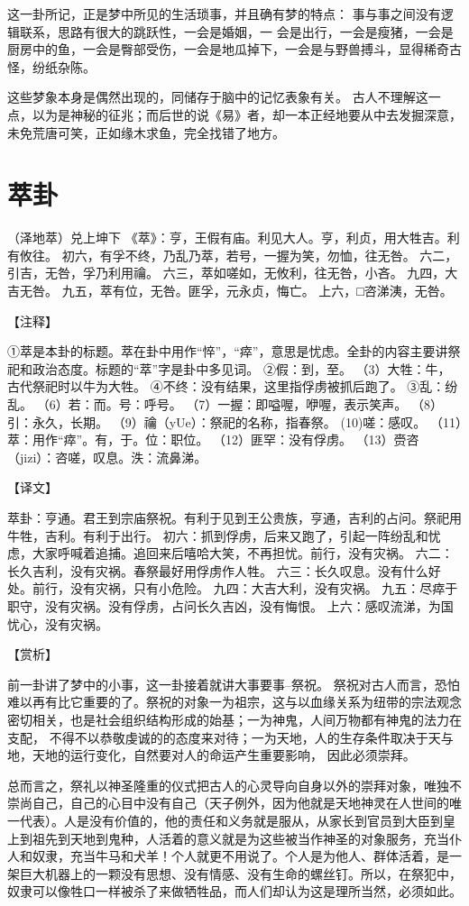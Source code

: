\documentclass[a4paper,12pt,UTF8,twoside]{ctexbook}
\begin{document}
这一卦所记，正是梦中所见的生活琐事，并且确有梦的特点： 事与事之间没有逻辑联系，思路有很大的跳跃性，一会是婚姻，一 会是出行，一会是瘦猪，一会是厨房中的鱼，一会是臀部受伤，一会是地瓜掉下，一会是与野兽搏斗，显得稀奇古怪，纷纸杂陈。

这些梦象本身是偶然出现的，同储存于脑中的记忆表象有关。 古人不理解这一点，以为是神秘的征兆；而后世的说《易》者，却一本正经地要从中去发掘深意，未免荒唐可笑，正如缘木求鱼，完全找错了地方。

\chapter{萃卦}

（泽地萃）兑上坤下
《萃》：亨，王假有庙。利见大人。亨，利贞，用大牲吉。利有攸往。
初六，有孚不终，乃乱乃萃，若号，一握为笑，勿恤，往无咎。
六二，引吉，无咎，孚乃利用禴。
六三，萃如嗟如，无攸利，往无咎，小吝。
九四，大吉无咎。
九五，萃有位，无咎。匪孚，元永贞，悔亡。
上六，□咨涕洟，无咎。

【注释】

①萃是本卦的标题。萃在卦中用作“悴”，“瘁”，意思是忧虑。全卦的内容主要讲祭祀和政治态度。标题的“萃”字是卦中多见词。
②假：到，至。
（3）大牲：牛，古代祭祀时以牛为大牲。
④不终：没有结果，这里指俘虏被抓后跑了。
③乱：纷乱。
（6）若：而。号：呼号。
（7）一握：即嗌喔，咿喔，表示笑声。
（8）引：永久，长期。
（9）禴（yUe）：祭祀的名称，指春祭。
(10)嗟：感叹。
（11）萃：用作“瘁”。有，于。位：职位。
（12）匪罕：没有俘虏。
（13）赍咨（jizi）：咨嗟，叹息。泆：流鼻涕。

【译文】

萃卦：亨通。君王到宗庙祭祝。有利于见到王公贵族，亨通，吉利的占问。祭祀用牛牲，吉利。有利于出行。
初六：抓到俘虏，后来又跑了，引起一阵纷乱和忧虑，大家呼喊着追捕。追回来后嘻哈大笑，不再担忧。前行，没有灾祸。
六二：长久吉利，没有灾祸。春祭最好用俘虏作人牲。
六三：长久叹息。没有什么好处。前行，没有灾祸，只有小危险。
九四：大吉大利，没有灾祸。
九五：尽瘁于职守，没有灾祸。没有俘虏，占问长久吉凶，没有悔恨。
上六：感叹流涕，为国忧心，没有灾祸。

【赏析】

前一卦讲了梦中的小事，这一卦接着就讲大事要事--祭祝。 祭祝对古人而言，恐怕难以再有比它重要的了。祭祝的对象一为祖宗，这与以血缘关系为纽带的宗法观念密切相关，也是社会组织结构形成的始基；一为神鬼，人间万物都有神鬼的法力在支配， 不得不以恭敬虔诚的的态度来对待；一为天地，人的生存条件取决于天与地，天地的运行变化，自然要对人的命运产生重要影响， 因此必须崇拜。

总而言之，祭礼以神圣隆重的仪式把古人的心灵导向自身以外的崇拜对象，唯独不崇尚自己，自己的心目中没有自己（天子例外，因为他就是天地神灵在人世间的唯一代表）。人是没有价值的，他的责任和义务就是服从，从家长到官员到大臣到皇上到祖先到天地到鬼种，人活着的意义就是为这些被当作神圣的对象服务，充当仆人和奴隶，充当牛马和犬羊！个人就更不用说了。个人是为他人、群体活着，是一架巨大机器上的一颗没有思想、没有情感、没有生命的螺丝钉。所以，在祭犯中，奴隶可以像牲口一样被杀了来做牺牲品，而人们却认为这是理所当然，必须如此。
\end{document}
